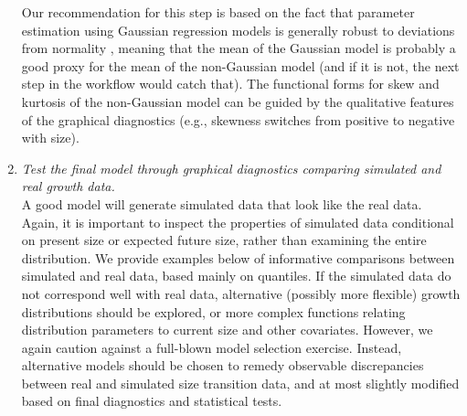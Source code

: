 \documentclass[12pt]{article}
\begin{document}
\begin{enumerate}[label=\arabic*., listparindent=1.5em]
Our recommendation for this step is based on the fact that parameter estimation using Gaussian regression models is generally robust to deviations from normality \citep{schielzeth2020robustness}, meaning that the mean of the Gaussian model is probably a good proxy for the mean of the non-Gaussian model (and if it is not, the next step in the workflow would catch that). 
The functional forms for skew and kurtosis of the non-Gaussian model can be guided by the qualitative features of the graphical diagnostics (e.g., skewness switches from positive to negative with size). 

\item \textit{Test the final model through graphical diagnostics comparing simulated and real growth data.} 
\\
A good model will generate simulated data that look like the real data.  
Again, it is important to inspect the properties of simulated data conditional on present size or expected future size, rather than examining the entire distribution.   
We provide examples below of informative comparisons between simulated and real data, based mainly on quantiles. 
If the simulated data do not correspond well with real data, alternative (possibly more flexible) growth distributions should be explored, or more complex functions relating distribution parameters to current size and other covariates. 
However, we again caution against a full-blown model selection exercise. 
Instead, alternative models should be chosen to remedy observable discrepancies between real and simulated size transition data, and at most slightly modified based on final diagnostics and statistical tests.

\end{enumerate}
\end{document}
